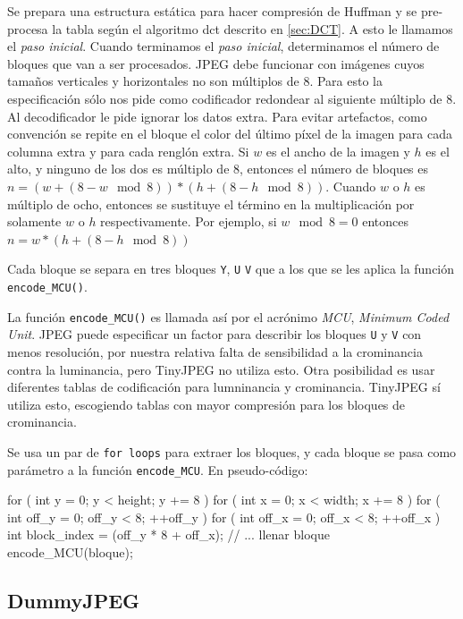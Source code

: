 Se prepara una estructura estática para hacer compresión de Huffman y se
pre-procesa la tabla según el algoritmo dct descrito en \ref{sec:DCT}. A esto
le llamamos el \emph{paso inicial}.  Cuando terminamos el \emph{paso inicial},
determinamos el número de bloques que van a ser procesados. JPEG debe funcionar
con imágenes cuyos tamaños verticales y horizontales no son múltiplos de 8.
Para esto la especificación sólo nos pide como codificador redondear al
siguiente múltiplo de 8. Al decodificador le pide ignorar los datos extra. Para
evitar \gls{artefactos}, como convención se repite en el bloque el color del
último píxel de la imagen para cada columna extra y para cada renglón extra. Si
$w$ es el ancho de la imagen y $h$ es el alto, y ninguno de los dos es múltiplo
de 8, entonces el número de bloques es $n = (w + (8 - w \mod 8)) * (h + (8 - h
\mod 8))$. Cuando $w$ o $h$ es múltiplo de ocho, entonces se sustituye el
término en la multiplicación por solamente $w$ o $h$ respectivamente. Por
ejemplo, si $w \mod 8 = 0$ entonces $n = w * (h + (8 - h \mod 8))$

Cada bloque se separa en tres bloques \verb+Y+, \verb+U+ \verb+V+ que a los que
se les aplica la función \verb+encode_MCU()+.

La función \verb+encode_MCU()+ es llamada así por el acrónimo \emph{\gls{MCU}},
\emph{Minimum Coded Unit}. JPEG puede especificar un factor para describir los
bloques \verb+U+ y \verb+V+ con menos resolución, por nuestra relativa falta de
sensibilidad a la crominancia contra la luminancia, pero TinyJPEG no utiliza
esto. Otra posibilidad es usar diferentes tablas de codificación para
lumninancia y crominancia. TinyJPEG sí utiliza esto, escogiendo tablas con
mayor compresión para los bloques de crominancia.

Se usa un par de \verb+for loops+ para extraer los bloques, y cada bloque se pasa como
parámetro a la función \verb+encode_MCU+. En pseudo-código:

\begin{code}[language=C][h]
    for ( int y = 0; y < height; y += 8 ) {
        for ( int x = 0; x < width; x += 8 ) {
            for ( int off_y = 0; off_y < 8; ++off_y ) {
                for ( int off_x = 0; off_x < 8; ++off_x ) {
                    int block_index = (off_y * 8 + off_x);
                    // ... llenar bloque
                }
            }
            encode_MCU(bloque);
        }
    }
\end{code}

\subsection{DummyJPEG} \label{sub:dummy}

